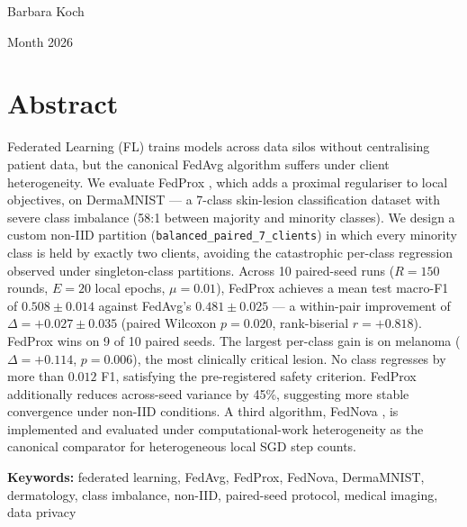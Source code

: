 \documentclass[11pt,a4paper]{report}  %
\newif\ifshowtodo
\newcommand{\TODOhpc}[1]{%
  \ifshowtodo\textcolor{red}{\textbf{[HPC PENDING: #1]}}\else#1\fi}
\begin{document}
\vspace{2cm}
\hfill Barbara Koch

\hfill \TODOhpc{Month} 2026

\chapter*{Abstract}
\thispagestyle{empty}

Federated Learning (FL) trains models across data silos without
centralising patient data, but the canonical FedAvg algorithm
\citep{mcmahan2017fedavg} suffers under client heterogeneity. We
evaluate FedProx \citep{li2020fedprox}, which adds a proximal
regulariser to local objectives, on DermaMNIST --- a 7-class
skin-lesion classification dataset with severe class imbalance
(58:1 between majority and minority classes). We design a custom
non-IID partition (\texttt{balanced\_paired\_7\_clients}) in which
every minority class is held by exactly two clients, avoiding the
catastrophic per-class regression observed under singleton-class
partitions. Across 10 paired-seed runs ($R = 150$ rounds, $E = 20$
local epochs, $\mu = 0.01$), FedProx achieves a mean test macro-F1
of $0.508 \pm 0.014$ against FedAvg's $0.481 \pm 0.025$ --- a
within-pair improvement of $\Delta = +0.027 \pm 0.035$ (paired
Wilcoxon $p = 0.020$, rank-biserial $r = +0.818$). FedProx wins on
9 of 10 paired seeds. The largest per-class gain is on melanoma
($\Delta = +0.114$, $p = 0.006$), the most clinically critical
lesion. No class regresses by more than $0.012$ F1, satisfying the
pre-registered safety criterion. FedProx additionally reduces
across-seed variance by 45\%, suggesting more stable convergence
under non-IID conditions. A third algorithm, FedNova
\citep{wang2020fednova}, is implemented and evaluated under
computational-work heterogeneity as the canonical comparator for
heterogeneous local SGD step counts.

\vspace{1em}
\noindent\textbf{Keywords:} federated learning, FedAvg, FedProx, FedNova,
DermaMNIST, dermatology, class imbalance, non-IID, paired-seed protocol,
medical imaging, data privacy

\tableofcontents
\listoffigures
\listoftables
\end{document}
